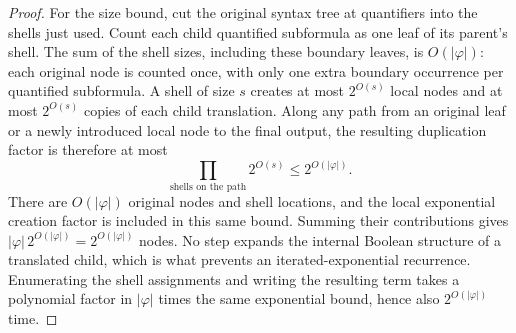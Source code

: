 \begin{proof}
For the size bound, cut the original syntax tree at
quantifiers into the shells just used. Count each child quantified
subformula as one leaf of its parent's shell. The sum of the shell sizes,
including these boundary leaves, is $O(|\varphi|)$: each original node is counted
once, with only one extra boundary occurrence per quantified subformula.
A shell of size $s$ creates at most $2^{O(s)}$ local nodes and at most
$2^{O(s)}$ copies of each child translation. Along any path from an
original leaf or a newly introduced local node to the final output,
the resulting duplication factor is therefore at most
\[
 \prod_{\text{shells on the path}}2^{O(s)}
       \le 2^{O(|\varphi|)}.
\]
There are $O(|\varphi|)$ original nodes and shell locations, and the local
exponential creation factor is included in this same bound. Summing
their contributions gives $|\varphi|\,2^{O(|\varphi|)}=2^{O(|\varphi|)}$ nodes.
No step expands the internal Boolean structure of a translated child,
which is what prevents an iterated-exponential recurrence.
Enumerating the shell assignments and writing the resulting term
takes a polynomial factor in $|\varphi|$ times the same exponential
bound, hence also $2^{O(|\varphi|)}$ time.
\end{proof}
